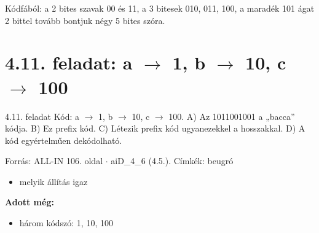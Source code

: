 

\begin{center}\end{center}

Kódfából: a 2 bites szavak 00 és 11, a 3 bitesek 010, 011, 100, a maradék 101 ágat 2 bittel tovább bontjuk négy 5 bites szóra.

\begin{center}\end{center}
\begin{eredmeny}

\begin{center}\end{center}
\end{eredmeny}


\section{\texorpdfstring{4.11. feladat: a $\to$ 1, b $\to$ 10, c $\to$ 100}{4.11. feladat: a → 1, b → 10, c → 100}}\label{ai4_11}
\setcounter{lepes}{0}
\begin{feladat}{4.11. feladat}
Kód: a $\to$ 1, b $\to$ 10, c $\to$ 100. A) Az 1011001001 a „bacca” kódja. B) Ez prefix kód. C) Létezik prefix kód ugyanezekkel a hosszakkal. D) A kód egyértelműen dekódolható.

{\footnotesize\sffamily Forrás: ALL-IN 106. oldal $\cdot$ aiD\_4\_6 (4.5.). Címkék: beugró}
\end{feladat}
\begin{keresunk}
\begin{itemize}
\item melyik állítás igaz
\end{itemize}
\end{keresunk}
\begin{jeloles}
\par\smallskip\textbf{Adott még:}
\begin{itemize}
\item három kódszó: 1, 10, 100
\end{itemize}
\end{jeloles}

